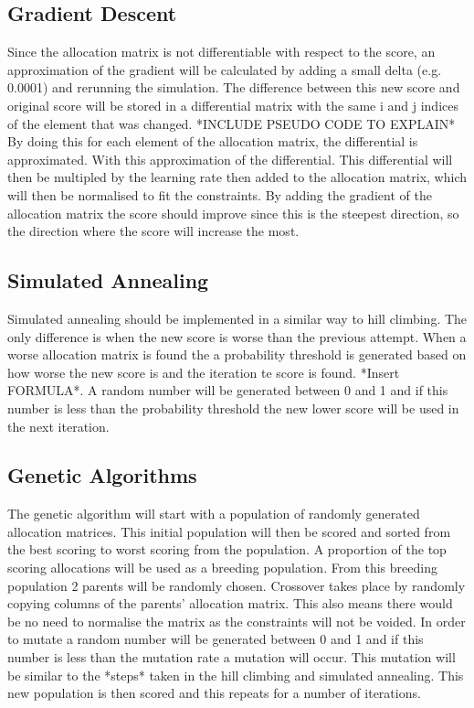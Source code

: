 \subsection{Gradient Descent}

Since the allocation matrix is not differentiable with respect to the score, an approximation of the gradient will be calculated by adding a small delta (e.g. 0.0001) and rerunning the simulation. The difference between this new score and original score will be stored in a differential matrix with the same i and j indices of the element that was changed.
*INCLUDE PSEUDO CODE TO EXPLAIN*
By doing this for each element of the allocation matrix, the differential is approximated. With this approximation of the differential. This differential will then be multipled by the learning rate then added to the allocation matrix, which will then be normalised to fit the constraints. By adding the gradient of the allocation matrix the score should improve since this is the steepest direction, so the direction where the score will increase the most.

\subsection{Simulated Annealing}

Simulated annealing should be implemented in a similar way to hill climbing. The only difference is when the new score is worse than the previous attempt. When a worse allocation matrix is found the a probability threshold is generated based on how worse the new score is and the iteration te score is found. *Insert FORMULA*. A random number will be generated between 0 and 1 and if this number is less than the probability threshold the new lower score will be used in the next iteration.

\subsection{Genetic Algorithms}

The genetic algorithm will start with a population of randomly generated allocation matrices. This initial population will then be scored and sorted from the best scoring to worst scoring from the population. A proportion of the top scoring allocations will be used as a breeding population. From this breeding population 2 parents will be randomly chosen. Crossover takes place by randomly copying columns of the parents' allocation matrix. This also means there would be no need to normalise the matrix as the constraints will not be voided. In order to mutate a random number will be generated between 0 and 1 and if this number is less than the mutation rate a mutation will occur. This mutation will be similar to the *steps* taken in the hill climbing and simulated annealing. This new population is then scored and this repeats for a number of iterations.

